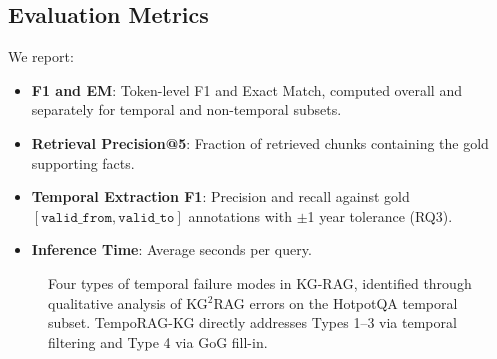 \documentclass[11pt]{article}
\begin{document}
\subsection{Evaluation Metrics}

We report:
\begin{itemize}
  \item \textbf{F1 and EM}: Token-level F1 and Exact Match, computed
    overall and separately for temporal and non-temporal subsets.
  \item \textbf{Retrieval Precision@5}: Fraction of retrieved chunks
    containing the gold supporting facts.
  \item \textbf{Temporal Extraction F1}: Precision and recall against
    gold $[\mathtt{valid\_from}, \mathtt{valid\_to}]$ annotations
    with $\pm$1 year tolerance (RQ3).
  \item \textbf{Inference Time}: Average seconds per query.
\end{itemize}

\begin{figure}[t]
  \centering
  \caption{Four types of temporal failure modes in KG-RAG, identified
  through qualitative analysis of KG$^2$RAG errors on the HotpotQA
  temporal subset. TempoRAG-KG directly addresses Types 1--3 via
  temporal filtering and Type 4 via GoG fill-in.}
  \label{fig:taxonomy}
\end{figure}
\end{document}
